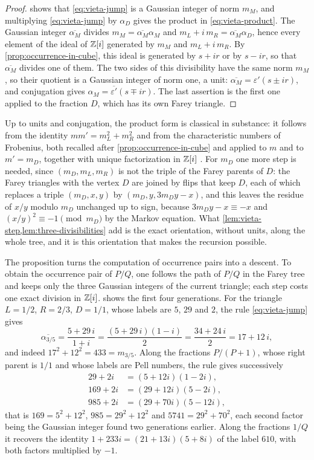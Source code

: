 \begin{proof}
 shows that \eqref{eq:vieta-jump} is a Gaussian
integer of norm $m_M$, and multiplying \eqref{eq:vieta-jump} by $\alpha_D$
gives the product in \eqref{eq:vieta-product}. The Gaussian integer
$\overline{\alpha_M}$ divides $m_M=\overline{\alpha_M}\alpha_M$ and
$m_L+i\,m_R=\overline{\alpha_M}\alpha_D$, hence every element of the ideal of
$\mathbb{Z}[i]$ generated by $m_M$ and $m_L+i\,m_R$. By \cref{prop:occurrence-in-cube},
this ideal is generated by $s+ir$ or by $s-ir$, so that $\overline{\alpha_M}$
divides one of them. The two sides of this divisibility have the same norm
$m_M$, so their quotient is a Gaussian integer of norm one, a unit:
$\overline{\alpha_M}=\varepsilon'(s\pm ir)$, and conjugation gives
$\alpha_M=\overline{\varepsilon'}(s\mp ir)$. The last assertion is the first
one applied to the fraction $D$, which has its own Farey triangle.
\end{proof}

Up to units and conjugation, the product form is classical in substance: it
follows from the identity $mm'=m_L^2+m_R^2$ and from the characteristic
numbers of Frobenius, both recalled after \cref{prop:occurrence-in-cube} and
applied to $m$ and to $m'=m_D$, together with unique factorization in $\mathbb{Z}[i]$
\cite[\S\S1--2]{Frobenius1913}. For $m_D$ one more step is needed, since
$(m_D,m_L,m_R)$ is not the triple of the Farey parents of $D$: the Farey
triangles with the vertex $D$ are joined by flips that keep $D$, each of which
replaces a triple $(m_D,x,y)$ by $(m_D,y,3m_Dy-x)$, and this leaves the residue
of $x/y$ modulo $m_D$ unchanged up to sign, because $3m_Dy-x\equiv-x$ and
$(x/y)^2\equiv-1\pmod{m_D}$ by the Markov equation. What
\cref{lem:vieta-step,lem:three-divisibilities} add is the exact orientation,
without units, along the whole tree, and it is this orientation that makes the
recursion possible.

The proposition turns the computation of occurrence pairs into a descent.
To obtain the occurrence pair of $P/Q$, one follows the path of $P/Q$ in the
Farey tree and keeps only the three Gaussian integers of the current
triangle; each step costs one exact division in $\mathbb{Z}[i]$.
 shows the first four generations. For the triangle
$L=1/2$, $R=2/3$, $D=1/1$, whose labels are $5$, $29$ and $2$, the rule
\eqref{eq:vieta-jump} gives
$$
 \overline{\alpha_{3/5}}=\frac{5+29\,i}{1+i}=\frac{(5+29\,i)(1-i)}2
 =\frac{34+24\,i}2=17+12\,i ,
$$
and indeed $17^2+12^2=433=m_{3/5}$. Along the fractions $P/(P+1)$, whose right
parent is $1/1$ and whose labels are Pell numbers, the rule gives
successively
\begin{align*}
 29+2i&=(5+12i)(1-2i),\\
 169+2i&=(29+12i)(5-2i),\\
 985+2i&=(29+70i)(5-12i),
\end{align*}
that is $169=5^2+12^2$, $985=29^2+12^2$ and $5741=29^2+70^2$, each second
factor being the Gaussian integer found two generations earlier. Along the
fractions $1/Q$ it recovers the identity $1+233i=(21+13i)(5+8i)$ of the
label $610$, with both factors multiplied by $-1$.

